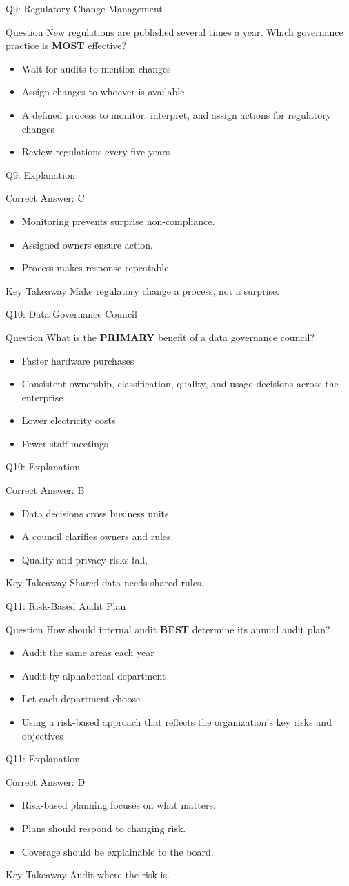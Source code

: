 \documentclass[aspectratio=169]{beamer}
\newcommand{\hq}[7]{%
	\begin{frame}{Q#1: #2}
		\begin{block}{Question}
			#3
		\end{block}
		\begin{itemize}
			#4
		\end{itemize}
	\end{frame}
	\begin{frame}{Q#1: Explanation}
		\begin{block}{Correct Answer: #5}
			\begin{itemize}
				#6
			\end{itemize}
		\end{block}
		\begin{alertblock}{Key Takeaway}
			#7
		\end{alertblock}
	\end{frame}
}
\begin{document}
	\hq{9}{Regulatory Change Management}
	{New regulations are published several times a year. Which governance practice is \textbf{MOST} effective?}
	{\item[\textbf{(A)}] Wait for audits to mention changes
		\item[\textbf{(B)}] Assign changes to whoever is available
		\item[\textbf{(C)}] A defined process to monitor, interpret, and assign actions for regulatory changes
		\item[\textbf{(D)}] Review regulations every five years}
	{C}
	{\item Monitoring prevents surprise non-compliance.
		\item Assigned owners ensure action.
		\item Process makes response repeatable.}
	{Make regulatory change a process, not a surprise.}
	
	\hq{10}{Data Governance Council}
	{What is the \textbf{PRIMARY} benefit of a data governance council?}
	{\item[\textbf{(A)}] Faster hardware purchases
		\item[\textbf{(B)}] Consistent ownership, classification, quality, and usage decisions across the enterprise
		\item[\textbf{(C)}] Lower electricity costs
		\item[\textbf{(D)}] Fewer staff meetings}
	{B}
	{\item Data decisions cross business units.
		\item A council clarifies owners and rules.
		\item Quality and privacy risks fall.}
	{Shared data needs shared rules.}
	
	\hq{11}{Risk-Based Audit Plan}
	{How should internal audit \textbf{BEST} determine its annual audit plan?}
	{\item[\textbf{(A)}] Audit the same areas each year
		\item[\textbf{(B)}] Audit by alphabetical department
		\item[\textbf{(C)}] Let each department choose
		\item[\textbf{(D)}] Using a risk-based approach that reflects the organization's key risks and objectives}
	{D}
	{\item Risk-based planning focuses on what matters.
		\item Plans should respond to changing risk.
		\item Coverage should be explainable to the board.}
	{Audit where the risk is.}
	
\end{document}
